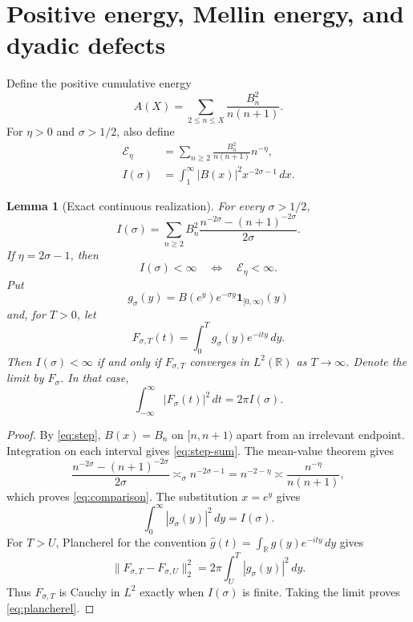 \documentclass[11pt,a4paper]{amsart}
\newtheorem{lemma}[theorem]{Lemma}
\theoremstyle{definition}
\theoremstyle{remark}
\newcommand{\R}{\mathbb R}
\begin{document}
\section{Positive energy, Mellin energy, and dyadic defects}

Define the positive cumulative energy
\begin{equation}\label{eq:A}
 A(X)=\sum_{2\leq n\leq X}\frac{B_n^2}{n(n+1)}.
\end{equation}
For $\eta>0$ and $\sigma>1/2$, also define
\begin{align}
 \mathcal E_\eta
 &=\sum_{n\geq2}\frac{B_n^2}{n(n+1)}n^{-\eta},\label{eq:weighted-energy}\\
 I(\sigma)
 &=\int_1^\infty |B(x)|^2x^{-2\sigma-1}\,dx.\label{eq:I}
\end{align}

\begin{lemma}[Exact continuous realization]\label{lem:mellin}
For every $\sigma>1/2$,
\begin{equation}\label{eq:step-sum}
 I(\sigma)=\sum_{n\geq2}B_n^2
 \frac{n^{-2\sigma}-(n+1)^{-2\sigma}}{2\sigma}.
\end{equation}
If $\eta=2\sigma-1$, then
\begin{equation}\label{eq:comparison}
 I(\sigma)<\infty
 \quad\Longleftrightarrow\quad
 \mathcal E_\eta<\infty.
\end{equation}
Put
\[
 g_\sigma(y)=B(e^y)e^{-\sigma y}\mathbf 1_{[0,\infty)}(y)
\]
and, for $T>0$, let
\[
 F_{\sigma,T}(t)=\int_0^T g_\sigma(y)e^{-ity}\,dy.
\]
Then $I(\sigma)<\infty$ if and only if $F_{\sigma,T}$ converges in
$L^2(\R)$ as $T\to\infty$.  Denote the limit by $F_\sigma$.  In that case,
\begin{equation}\label{eq:plancherel}
 \int_{-\infty}^{\infty}|F_\sigma(t)|^2\,dt
 =2\pi I(\sigma).
\end{equation}
\end{lemma}

\begin{proof}
By \eqref{eq:step}, $B(x)=B_n$ on $[n,n+1)$ apart from an irrelevant
endpoint.  Integration on each interval gives \eqref{eq:step-sum}.  The
mean-value theorem gives
\[
 \frac{n^{-2\sigma}-(n+1)^{-2\sigma}}{2\sigma}
 \asymp_\sigma n^{-2\sigma-1}
 =n^{-2-\eta}
 \asymp \frac{n^{-\eta}}{n(n+1)},
\]
which proves \eqref{eq:comparison}.  The substitution $x=e^y$ gives
\[
 \int_0^\infty|g_\sigma(y)|^2\,dy=I(\sigma).
\]
For $T>U$, Plancherel for the convention
$\widehat g(t)=\int_\R g(y)e^{-ity}\,dy$ gives
\[
 \|F_{\sigma,T}-F_{\sigma,U}\|_2^2
 =2\pi\int_U^T|g_\sigma(y)|^2\,dy.
\]
Thus $F_{\sigma,T}$ is Cauchy in $L^2$ exactly when $I(\sigma)$ is finite.
Taking the limit proves \eqref{eq:plancherel}.
\end{proof}
\end{document}
